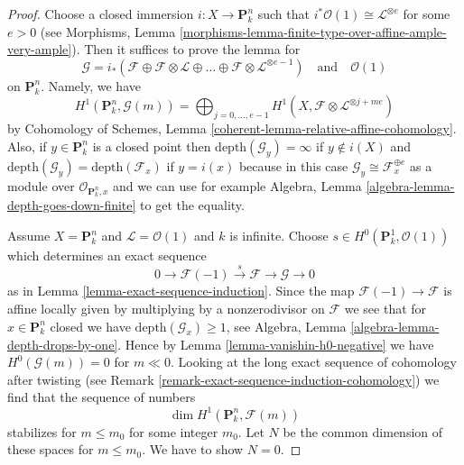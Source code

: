 \begin{proof}
Choose a closed immersion $i : X \to \mathbf{P}^n_k$ such that
$i^*\mathcal{O}(1) \cong \mathcal{L}^{\otimes e}$ for some $e > 0$
(see Morphisms, Lemma
\ref{morphisms-lemma-finite-type-over-affine-ample-very-ample}).
Then it suffices to prove the lemma for
$$
\mathcal{G} =
i_*(\mathcal{F} \oplus \mathcal{F} \otimes \mathcal{L} \oplus \ldots
\oplus \mathcal{F} \otimes \mathcal{L}^{\otimes e - 1})
\quad\text{and}\quad \mathcal{O}(1)
$$
on $\mathbf{P}^n_k$. Namely, we have
$$
H^1(\mathbf{P}^n_k, \mathcal{G}(m)) =
\bigoplus\nolimits_{j = 0, \ldots, e - 1}
H^1(X, \mathcal{F} \otimes \mathcal{L}^{\otimes j + me})
$$
by
Cohomology of Schemes, Lemma \ref{coherent-lemma-relative-affine-cohomology}.
Also, if $y \in \mathbf{P}^n_k$ is a closed point then
$\text{depth}(\mathcal{G}_y) = \infty$ if $y \not \in i(X)$
and $\text{depth}(\mathcal{G}_y) = \text{depth}(\mathcal{F}_x)$
if $y = i(x)$ because in this case
$\mathcal{G}_y \cong \mathcal{F}_x^{\oplus e}$ as a module over
$\mathcal{O}_{\mathbf{P}^n_k, x}$ and we can use for example
Algebra, Lemma \ref{algebra-lemma-depth-goes-down-finite}
to get the equality.

\medskip\noindent
Assume $X = \mathbf{P}^n_k$ and $\mathcal{L} = \mathcal{O}(1)$ and
$k$ is infinite. Choose $s \in H^0(\mathbf{P}^1_k, \mathcal{O}(1))$
which determines an exact sequence
$$
0 \to \mathcal{F}(-1) \xrightarrow{s} \mathcal{F} \to \mathcal{G} \to 0
$$
as in Lemma \ref{lemma-exact-sequence-induction}. Since the map
$\mathcal{F}(-1) \to \mathcal{F}$ is affine locally given by
multiplying by a nonzerodivisor on $\mathcal{F}$
we see that for $x \in \mathbf{P}^n_k$ closed we have
$\text{depth}(\mathcal{G}_x) \geq 1$, see
Algebra, Lemma \ref{algebra-lemma-depth-drops-by-one}.
Hence by Lemma \ref{lemma-vanishin-h0-negative}
we have $H^0(\mathcal{G}(m)) = 0$ for $m \ll 0$.
Looking at the long exact sequence of cohomology after twisting
(see Remark \ref{remark-exact-sequence-induction-cohomology})
we find that the sequence of numbers
$$
\dim H^1(\mathbf{P}^n_k, \mathcal{F}(m))
$$
stabilizes for $m \leq m_0$ for some integer $m_0$.
Let $N$ be the common dimension of these
spaces for $m \leq m_0$. We have to show $N = 0$.


\end{proof}
